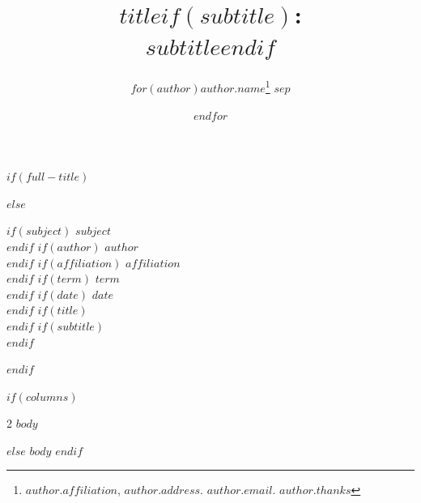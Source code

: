 \documentclass[$fontsize$,letterpaper,twoside]{article}
\title{\Large\textbf{{$title$}$if(subtitle)$:\\ $subtitle$}$endif$}
\author{$for(author)$\normalsize{$author.name$}\thanks{$author.affiliation$, $author.address$. $author.email$. $author.thanks$} $sep$ \and $endfor$}
\date{}
\begin{document}
\color{OffBlack}
\singlespacing
{}

$if(full-title)$
\maketitle

$else$

\thispagestyle{empty}
\begin{flushleft}

$if(subject)$
\small{$subject$} \\
$endif$
$if(author)$
\small{$author$} \\
$endif$
$if(affiliation)$
\small{$affiliation$}  \\
$endif$
$if(term)$
\small{$term$} \\
$endif$
$if(date)$
\small{$date$} \\
$endif$
$if(title)$
\vspace{5mm}
\sffamily\centering\Large\textbf{\color{Maroon}{$title$}} \\
$endif$
$if(subtitle)$
\vspace{2mm}
\sffamily\centering\Large\itshape{\color{Maroon}{$subtitle$}} \\
$endif$
\vspace{5mm}
\end{flushleft}
$endif$

$if(columns)$
\setlength{\columnsep}{3em}
\begin{multicols*}{2}
$body$
\end{multicols*}

$else$
$body$
$endif$
\end{document}
